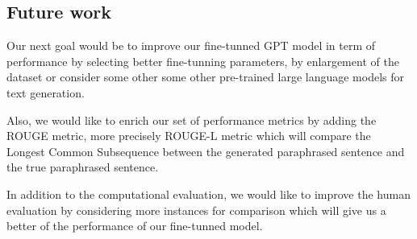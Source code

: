 \documentclass[fleqn,moreauthors,10pt]{ds_report}
\begin{document}
\subsection*{Future work}
Our next goal would be to improve our fine-tunned GPT model in term of performance by selecting better fine-tunning parameters, by enlargement of the dataset or consider some other some other pre-trained large language models for text generation.
\par
Also, we would like to enrich our set of performance metrics by adding the ROUGE metric, more precisely ROUGE-L metric which will compare the Longest Common Subsequence between the generated paraphrased sentence and the true paraphrased sentence.
\par
In addition to the computational evaluation, we would like to improve the human evaluation by considering more instances for comparison which will give us a better of the performance of our fine-tunned model.




\end{document}
